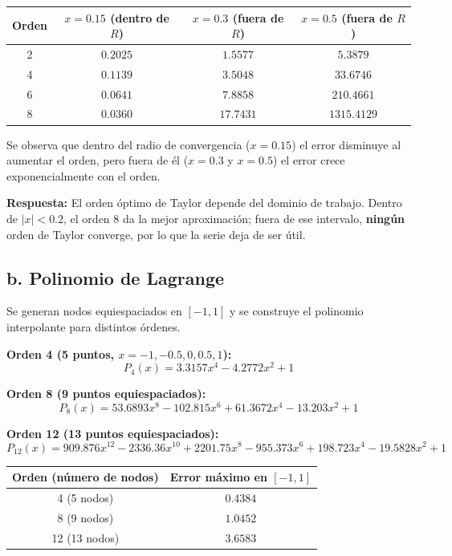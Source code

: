\documentclass[12pt,a4paper]{article}
\begin{document}
\begin{center}
\begin{tabular}{cccc}
\toprule
Orden & $x=0.15$ (dentro de $R$) & $x=0.3$ (fuera de $R$) & $x=0.5$ (fuera de $R$) \\
\midrule
2 & $0.2025$ & $1.5577$   & $5.3879$    \\
4 & $0.1139$ & $3.5048$   & $33.6746$   \\
6 & $0.0641$ & $7.8858$   & $210.4661$  \\
8 & $0.0360$ & $17.7431$  & $1315.4129$ \\
\bottomrule
\end{tabular}
\end{center}

Se observa que dentro del radio de convergencia ($x=0.15$) el error disminuye al aumentar el orden, pero fuera de \'el ($x=0.3$ y $x=0.5$) el error crece exponencialmente con el orden.

\textbf{Respuesta:} El orden \'optimo de Taylor depende del dominio de trabajo. Dentro de $|x|<0.2$, el orden $\boxed{8}$ da la mejor aproximaci\'on; fuera de ese intervalo, \textbf{ning\'un} orden de Taylor converge, por lo que la serie deja de ser \'util.

\subsection*{b. Polinomio de Lagrange}

Se generan nodos equiespaciados en $[-1,1]$ y se construye el polinomio interpolante para distintos \'ordenes.

\textbf{Orden 4 (5 puntos, $x=-1,-0.5,0,0.5,1$):}
\[
P_4(x) = 3.3157x^4 - 4.2772x^2 + 1
\]

\textbf{Orden 8 (9 puntos equiespaciados):}
\[
P_8(x) = 53.6893x^8 - 102.815x^6 + 61.3672x^4 - 13.203x^2 + 1
\]

\textbf{Orden 12 (13 puntos equiespaciados):}
\[
P_{12}(x) = 909.876x^{12} - 2336.36x^{10} + 2201.75x^8 - 955.373x^6 + 198.723x^4 - 19.5828x^2 + 1
\]

\begin{center}
\begin{tabular}{cc}
\toprule
Orden (n\'umero de nodos) & Error m\'aximo en $[-1,1]$ \\
\midrule
4  (5 nodos)  & $0.4384$ \\
8  (9 nodos)  & $1.0452$ \\
12 (13 nodos) & $3.6583$ \\
\bottomrule
\end{tabular}
\end{center}
\end{document}
